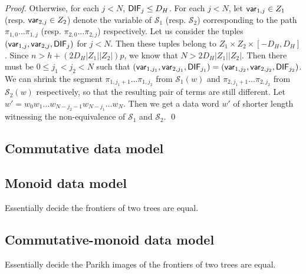 \documentclass[runningheads,a4paper]{llncs}
\newcommand\Ss{\mathcal{S}}
\begin{document}
\begin{proof}
Otherwise, for each $j < N$,  ${\sf DIF}_j \le D_H$. For each $j < N$, let ${\sf var}_{1,j} \in Z_1$ (resp. ${\sf var}_{2,j} \in Z_2$) denote the variable of $\Ss_1$ (resp. $\Ss_2$) corresponding to the path $\pi_{1,0} \dots \pi_{1,j}$ (resp. $\pi_{2,0} \dots \pi_{2,j}$) respectively. Let us consider the tuples $({\sf var}_{1,j}, {\sf var}_{2,j}, {\sf DIF}_j)$ for $j < N$. Then these tuples belong to $Z_1 \times Z_2 \times [-D_H, D_H]$. Since $n  > h+(2D_H |Z_1|  |Z_2|)p$,  we know that $N > 2D_H |Z_1|  |Z_2|$. 
Then there must be $0 \le j_1 < j_2 < N$ such that $({\sf var}_{1, j_1}, {\sf var}_{2, j_1}, {\sf DIF}_{j_1}) = ({\sf var}_{1, j_2}, {\sf var}_{2, j_2}, {\sf DIF}_{j_2})$. We can shrink the segment $\pi_{1, j_1+1} \dots \pi_{1,j_2}$ from $\Ss_1(w)$ and   $\pi_{2, j_1+1} \dots \pi_{2,j_2}$ from $\Ss_2(w)$ respectively, so that the resulting pair of terms are still different. Let $w' = w_0 w_1 \dots w_{N-j_2-1} w_{N- j_1} \dots w_N$. Then we get a data word $w'$ of shorter length witnessing the non-equivalence of $\Ss_1$ and $\Ss_2$. 
\qed
\end{proof}

\subsection{Commutative data model}

\subsection{Monoid data model}

Essentially decide the frontiers of two trees are equal.

\subsection{Commutative-monoid data model}

Essentially decide the Parikh images of the frontiers of two trees are equal. 
\end{document}

